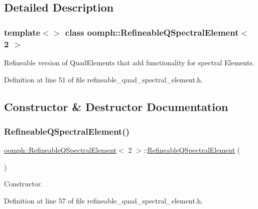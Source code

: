 \subsection{Detailed Description}
\subsubsection*{template$<$$>$\newline
class oomph\+::\+Refineable\+Q\+Spectral\+Element$<$ 2 $>$}

Refineable version of Quad\+Elements that add functionality for spectral Elements. 

Definition at line 51 of file refineable\+\_\+quad\+\_\+spectral\+\_\+element.\+h.



\subsection{Constructor \& Destructor Documentation}
\mbox{\label{classoomph_1_1RefineableQSpectralElement_3_012_01_4_aa061063e931d2b908a1fcee4b33d692a}} 
\subsubsection{\texorpdfstring{Refineable\+Q\+Spectral\+Element()}{RefineableQSpectralElement()}\hspace{0.1cm}{\footnotesize\ttfamily [1/2]}}
{\footnotesize\ttfamily \hyperlink{classoomph_1_1RefineableQSpectralElement}{oomph\+::\+Refineable\+Q\+Spectral\+Element}$<$ 2 $>$\+::\hyperlink{classoomph_1_1RefineableQSpectralElement}{Refineable\+Q\+Spectral\+Element} (\begin{DoxyParamCaption}{ }\end{DoxyParamCaption})\hspace{0.3cm}{\ttfamily [inline]}}



Constructor. 



Definition at line 57 of file refineable\+\_\+quad\+\_\+spectral\+\_\+element.\+h.



